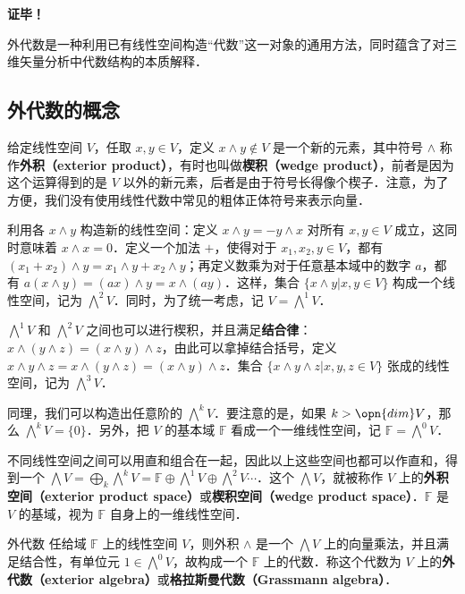 \textbf{证毕！}




外代数是一种利用已有线性空间构造“代数”这一对象的通用方法，同时蕴含了对三维矢量分析中代数结构的本质解释．

\subsection{外代数的概念}

给定线性空间 $V$，任取 $x, y\in V$，定义 $x\wedge y\not\in V$ 是一个新的元素，其中符号 $\wedge$ 称作\textbf{外积（exterior product）}，有时也叫做\textbf{楔积（wedge product）}，前者是因为这个运算得到的是 $V$ 以外的新元素，后者是由于符号长得像个楔子．注意，为了方便，我们没有使用线性代数中常见的粗体正体符号来表示向量．

利用各 $x\wedge y$ 构造新的线性空间：定义 $x\wedge y=-y\wedge x$ 对所有 $x, y\in V$ 成立，这同时意味着 $x\wedge x=0$．定义一个加法 $+$，使得对于 $x_1, x_2, y\in V$，都有 $(x_1+x_2)\wedge y=x_1\wedge y+x_2\wedge y$；再定义数乘为对于任意基本域中的数字 $a$，都有 $a(x\wedge y)=(ax)\wedge y=x\wedge(ay)$．这样，集合 $\{x\wedge y|x, y\in V\}$ 构成一个线性空间，记为 $\bigwedge^2 V$．同时，为了统一考虑，记 $V=\bigwedge^1 V$．

$\bigwedge^1 V$ 和 $\bigwedge^2 V$ 之间也可以进行楔积，并且满足\textbf{结合律}：$x\wedge(y\wedge z)=(x\wedge y)\wedge z$，由此可以拿掉结合括号，定义 $x\wedge y\wedge z=x\wedge(y\wedge z)=(x\wedge y)\wedge z$．集合 $\{x\wedge y\wedge z|x, y, z\in V\}$ 张成的线性空间，记为 $\bigwedge^3 V$．

同理，我们可以构造出任意阶的 $\bigwedge^k V$．要注意的是，如果 $k>\opn{dim} V$，那么 $\bigwedge^k V=\{0\}$．另外，把 $V$ 的基本域 $\mathbb{F}$ 看成一个一维线性空间，记 $\mathbb{F}=\bigwedge^0 V$．

不同线性空间之间可以用直和组合在一起，因此以上这些空间也都可以作直和，得到一个 $\bigwedge V=\bigoplus_k\bigwedge^k V=\mathbb{F}\oplus\bigwedge^1V\oplus\bigwedge^2V\cdots$．这个 $\bigwedge V$，就被称作 $V$ 上的\textbf{外积空间（exterior product space）}或\textbf{楔积空间（wedge product space）}．$\mathbb{F}$ 是 $V$ 的基域，视为 $\mathbb{F}$ 自身上的一维线性空间．

\begin{theorem}{外代数}
任给域 $\mathbb{F}$ 上的线性空间 $V$，则外积 $\wedge$ 是一个 $\bigwedge V$ 上的向量乘法，并且满足结合性，有单位元 $1\in \bigwedge^0 V$，故构成一个 $\mathbb{F}$ 上的代数．称这个代数为 $V$ 上的\textbf{外代数（exterior algebra）}或\textbf{格拉斯曼代数（Grassmann algebra）}．
\end{theorem}

